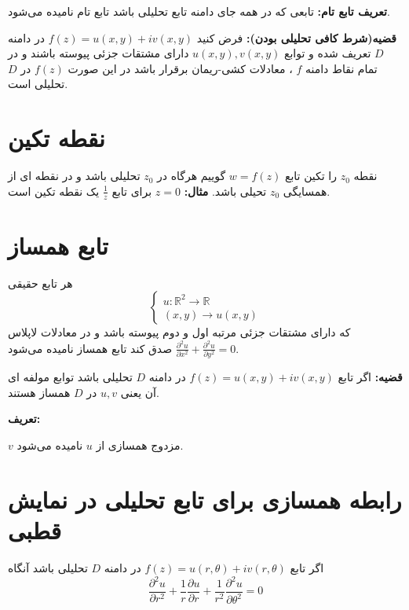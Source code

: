 \documentclass[12pt]{report}
\begin{document}
 	 	 	  \textbf{تعریف تابع تام:}
 	 	 	  تابعی که در همه جای دامنه تابع تحلیلی باشد تابع تام نامیده می‌شود.
 	 	 	  \newline
 	 	 	  
 	 	 	  \textbf{قضیه(شرط کافی تحلیلی بودن):}
 	 	 	  فرض کنید
 	 	 	  $f(z) = u(x, y) + iv(x, y)$
 	 	 	  در دامنه 
 	 	 	  $D$
 	 	 	  تعریف شده و توابع 
 	 	 	  $ u(x, y) , 	v(x, y)$
 	 	 	  دارای مشتقات جزئی پیوسته باشند و در تمام نقاط دامنه 
 	 	 	  $f$
 	 	 	  ،
 	 	 	  معادلات کشی-ریمان برقرار باشد در این صورت 
 	 	 	  $f(z)$
 	 	 	  در $D$
 	 	 	  تحلیلی است.
 	 	 	  
 	 	 	  \section{نقطه تکین}
 	 	 	  نقطه 
 	 	 	  $z_0$
 	 	 	  را تکین تابع 
 	 	 	  $w = f(z)$
 	 	 	  گوییم هرگاه در 
 	 	 	  $z_0$
 	 	 	  تحلیلی باشد و در نقطه ای از همسایگی
 	 	 	  $z_0$
 	 	 	  تحیلی باشد.
 	 	 	  \textbf{مثال:}
 	 	 	  $z= 0 $
 	 	 	  برای تابع
 	 	 	  $\frac{1}{z}$
 	 	 	  یک نقطه تکین است.	 	 
 	 	 	  
 	 	 	  \section{تابع همساز}
 	 	 	   هر تابع حقیقی
 	 	 	   \[
 	 	 	   \begin{cases}
 	 	 	   	u : \mathbb{R}^2 \rightarrow \mathbb{R}\\
 	 	 	   	(x, y) \rightarrow u(x, y)
 	 	 	   \end{cases}
 	 	 	   \]
 	 	 	   که دارای مشتقات جزئی مرتبه اول و دوم پیوسته باشد و در معادلات لاپلاس
 	 	 	   $\frac{\partial^2u}{\partial x^2}+ \frac{\partial^2u}{\partial y^2} = 0$
 	 	 	   صدق کند تابع همساز نامیده می‌شود.
 	 	 	   
 	 	 	   \textbf{قضیه:}
 	 	 	   اگر تابع 
 	 	 	   $f(z) = u(x, y) + iv(x, y)$
 	 	 	   در دامنه 
 	 	 	  $D$
 	 	 	  تحلیلی باشد توابع  مولفه ای آن یعنی 
 	 	 	  $u, v$
 	 	 	  در 
 	 	 	  $D$
 	 	 	  همساز هستند.
 	 	 	  
 	 	 	  \textbf{تعریف:}
 	 	 	  
 	 	 	  $v$
 	 	 	  مزدوج همسازی از 
 	 	 	  $u$
 	 	 	  نامیده می‌شود.
 	 	 	  
 	 	 	  
 	 	 	  \section{رابطه همسازی برای تابع تحلیلی در نمایش قطبی}
 	 	 	  اگر تابع
 	 	 	  $f(z) = u(r, \theta) + iv(r, \theta)$
 	 	 	  در دامنه 
 	 	 	  $D$
 	 	 	  تحلیلی باشد آنگاه
 	 	 	  $$ \frac{\partial^2 u}{\partial r^2} + \frac{1}{r}\frac{\partial u}{\partial r}+\frac{1}{r^2}\frac{\partial^2 u}{\partial \theta^2} = 0$$
 	 	 	  
\end{document}

